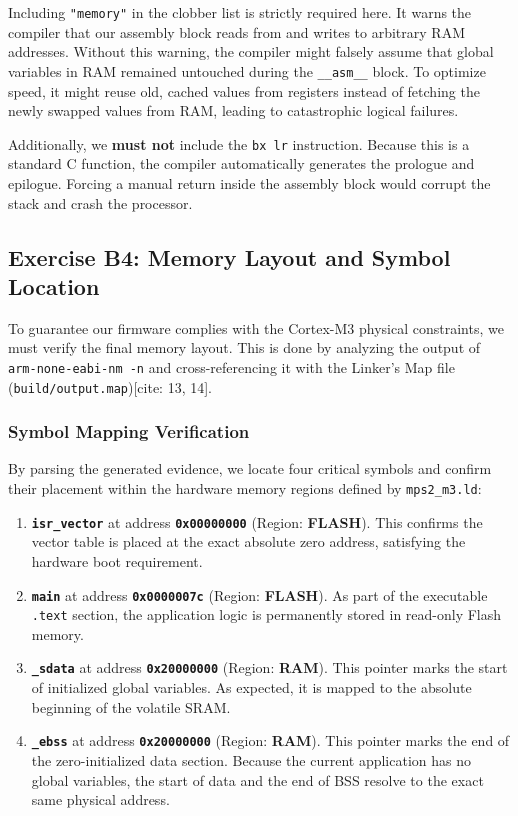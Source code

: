 Including \texttt{"memory"} in the clobber list is strictly required here. It warns the compiler that our assembly block reads from and writes to arbitrary RAM addresses. Without this warning, the compiler might falsely assume that global variables in RAM remained untouched during the \texttt{\_\_asm\_\_} block. To optimize speed, it might reuse old, cached values from registers instead of fetching the newly swapped values from RAM, leading to catastrophic logical failures.

Additionally, we \textbf{must not} include the \texttt{bx lr} instruction. Because this is a standard C function, the compiler automatically generates the prologue and epilogue. Forcing a manual return inside the assembly block would corrupt the stack and crash the processor.


\subsection{Exercise B4: Memory Layout and Symbol Location}
To guarantee our firmware complies with the Cortex-M3 physical constraints, we must verify the final memory layout. This is done by analyzing the output of \texttt{arm-none-eabi-nm -n} and cross-referencing it with the Linker's Map file (\texttt{build/output.map})[cite: 13, 14].

\subsubsection{Symbol Mapping Verification}
By parsing the generated evidence, we locate four critical symbols and confirm their placement within the hardware memory regions defined by \texttt{mps2\_m3.ld}:

\begin{enumerate}
    \item \textbf{\texttt{isr\_vector}} at address \textbf{\texttt{0x00000000}} (Region: \textbf{FLASH}).
    This confirms the vector table is placed at the exact absolute zero address, satisfying the hardware boot requirement.
    
    \item \textbf{\texttt{main}} at address \textbf{\texttt{0x0000007c}} (Region: \textbf{FLASH}).
    As part of the executable \texttt{.text} section, the application logic is permanently stored in read-only Flash memory.
    
    \item \textbf{\texttt{\_sdata}} at address \textbf{\texttt{0x20000000}} (Region: \textbf{RAM}).
    This pointer marks the start of initialized global variables. As expected, it is mapped to the absolute beginning of the volatile SRAM.
    
    \item \textbf{\texttt{\_ebss}} at address \textbf{\texttt{0x20000000}} (Region: \textbf{RAM}).
    This pointer marks the end of the zero-initialized data section. Because the current application has no global variables, the start of data and the end of BSS resolve to the exact same physical address.
\end{enumerate}

